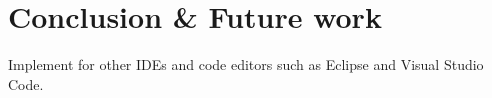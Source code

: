\documentclass[sigconf]{acmart}
\begin{document}
\section{Conclusion \& Future work} \label{sec:conclusion}


Implement for other IDEs and code editors such as Eclipse \cite{desrivieresEclipsePlatformIntegrating2004} and Visual Studio Code.





\end{document}
